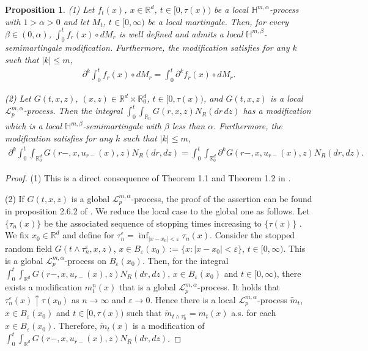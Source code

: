 \documentclass[12pt,oneside, reqno]{amsart}
\newcommand{\ce}{\begin{eqnarray*}}
\newcommand{\de}{\end{eqnarray*}}
\newtheorem{proposition}[theorem]{Proposition}
\def\mH{{\mathbb H}}
\def\mR{{\mathbb R}}
\def\sL{{\mathscr L}}
\def\leq{\leqslant}
\numberwithin{equation}{section}
\begin{document}
\begin{proposition}\label{Prosition3.4}
	(1)  Let $f_t(x)$, $x\in\mR^d$, $t\in[0,\tau(x))$ be a local $\mH^{m,\alpha}$-process with $1>\alpha>0$ and let  $M_t$, $t\in [0,\infty)$ be a local martingale.  Then, for every $\beta\in(0,\alpha)$,
	$\int_0^t f_r(x)\circ dM_r$
 is well defined and admits a local $\mH^{m,\beta}$-semimartingale modification. Furthermore, the modification satisfies for any $k$ such that $|k|\leq m$,
	\ce 
	\partial^k\int_0^tf_r(x)\circ dM_r=\int_0^t \partial^kf_r(x)\circ dM_r.
	\de 
	
	(2) Let $G(t,x,z)$, $(x,z)\in\mR^d\times \mR^d_0$, $t\in[0,\tau(x))$, and $G(t,x,z)$ is a local $\sL_{p}^{m,\alpha}$-process. Then the  integral $\int_0^t\int_{\mR_0}G(r,x,z) N_R(dr\,dz)$ has a modification which is a local $\mH^{m,\beta}$-semimartingale with $\beta$ less than $\alpha$. Furthermore, the modification satisfies for any $k$ such that $|k|\leq m$,
	\ce 
	\partial^k\int_0^t\int_{\mR^d_0} G(r-,x,u_{r-}(x),z) N_R(dr,dz)=\int_0^t\int_{\mR^d_0} \partial^k G(r-,x,u_{r-}(x),z) N_R(dr,dz).
	\de 
\end{proposition}
\begin{proof}
(1) This is a direct consequence of Theorem 1.1 and Theorem 1.2 in \cite{Kunita1984}.

(2) If $G(t,x,z)$ is a global $\sL_{p}^{m,\alpha}$-process, the proof of the assertion can be found in
 proposition 2.6.2 of \cite{KunitaHiroshi2019}. We reduce the local case to the global one as follows.  Let $\{\tau_n(x)\}$ be the associated sequence of stopping times increasing to $\{\tau(x)\}$ . We fix $x_0\in\mR^d$ and define for $\tau_n^{\varepsilon}=\inf_{|x-x_0|<\varepsilon}\tau_n(x)$. Consider the stopped random field $G(t\wedge\tau_n^{\varepsilon},x,z)$, $x\in B_\varepsilon(x_0):=\{x:|x-x_0|<\varepsilon\}$, $t\in[0,\infty)$. This is a global 
  $\sL_{p}^{m,\alpha}$-process on $ B_\varepsilon(x_0)$. Then, for the integral  $\int_0^t\int_{\mR^d} G(r-,x,u_{r-}(x),z) N_R(dr,dz)$, $x\in B_\varepsilon(x_0)$ and $t\in[0,\infty)$, there exists a modification $m_t^n(x)$  that is a global  $\sL_{p}^{m,\alpha}$-process. It holds that $\tau_n^\varepsilon(x)\uparrow \tau(x_0)$ as $n\to\infty$ and $\varepsilon\to 0$. Hence there is a local  $\sL_{p}^{m,\alpha}$-process $\tilde{m}_t$,  $x\in B_\varepsilon(x_0)$ and $t\in[0,\tau(x))$ such that $\tilde{m}_{t\wedge \tau_n^\varepsilon}=m_t(x)$ a.s. for each $x\in B_\varepsilon(x_0)$. Therefore, $\tilde{m}_t(x)$ is a modification of $\int_0^t\int_{\mR^d} G(r-,x,u_{r-}(x),z) N_R(dr,dz)$.
\end{proof}
\end{document}
